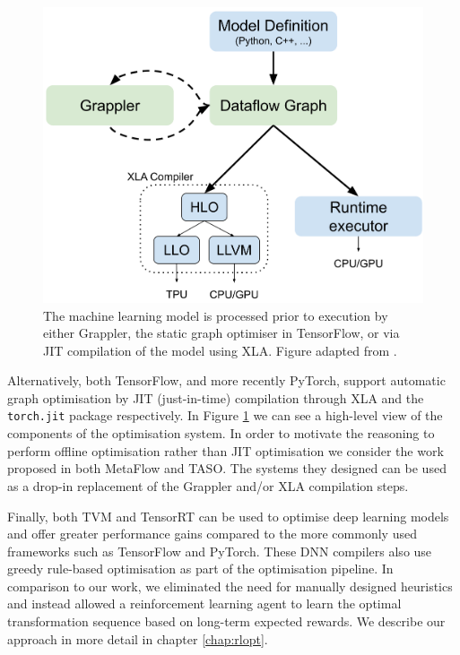 \begin{figure}[ht]
  \centering
  \includegraphics[width=0.75\columnwidth]{sections/3problem/images/GraphOptimiser}
  \caption[Architecture of graph optimisation system in TensorFlow]{The machine learning model is processed prior to execution by either Grappler, the static graph optimiser in TensorFlow, or via JIT compilation of the model using XLA. Figure adapted from \cite{larsen2019tensorflow}.}
  \label{fig:problem:graph-optim}
\end{figure}

Alternatively, both TensorFlow, and more recently PyTorch, support automatic graph optimisation by JIT (just-in-time) compilation through XLA and the \texttt{torch.jit} package respectively. In Figure \ref{fig:problem:graph-optim} we can see a high-level view of the components of the optimisation system. In order to motivate the reasoning to perform offline optimisation rather than JIT optimisation we consider the work proposed in both MetaFlow and TASO. The systems they designed can be used as a drop-in replacement of the Grappler and/or XLA compilation steps.

Finally, both TVM \cite{chen2018tvm} and TensorRT \cite{tensorrt2017} can be used to optimise deep learning models and offer greater performance gains compared to the more commonly used frameworks such as TensorFlow and PyTorch. These DNN compilers also use greedy rule-based optimisation as part of the optimisation pipeline. In comparison to our work, we eliminated the need for manually designed heuristics and instead allowed a reinforcement learning agent to learn the optimal transformation sequence based on long-term expected rewards. We describe our approach in more detail in chapter \ref{chap:rlopt}.



